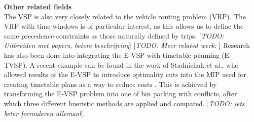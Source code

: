 \documentclass[ht]{article}
\newcommand{\todo}[1]{{\color{red}[\textit{TODO: #1}]}}
\begin{document}
\noindent \textbf{Other related fields}\\
The VSP is also very closely related to the vehicle routing problem (VRP). The VRP with time windows is of particular interest, as this allows us to define the same precedence constraints as those naturally defined by trips. \todo{Uitbreiden met papers, betere beschrijving}
\todo{Meer related werk: }
Research has also been done into integrating the E-VSP with timetable planning (E-TVSP). A recent example can be found in the work of Stadnichuk et al., who allowed results of the E-VSP to introduce optimality cuts into the MIP used for creating timetable plans as a way to reduce costs \cite{Stadnichuk2024}. This is achieved by transforming the E-VSP problem into one of bin packing with conflicts, after which three different hueristic methods are applied and compared. \todo{iets beter formuleren allemaal}. \\\\
\end{document}
